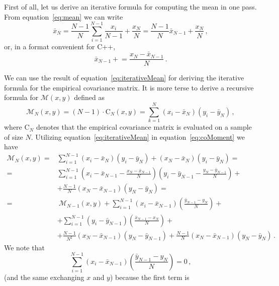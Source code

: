 \documentclass[10pt,a4paper]{report}
\begin{document}
First of all, let us derive an iterative formula for computing the mean in one pass. From equation~\ref{eq:mean} we can write
\begin{equation}
\bar{x}_N = \frac{N-1}{N}\sum\limits_{i=1}^{N-1}\frac{x_i}{N-1} + \frac{x_N}{N} = \frac{N-1}{N}\bar{x}_{N-1} + \frac{x_N}{N}\, ,
\label{eq:iterativeMean}
\end{equation}
or, in a format convenient for C++,
\begin{equation}
\bar{x}_{N-1} \mathrel{+}= \frac{x_N - \bar{x}_{N-1}}{N} \, .
\end{equation}

We can use the result of equation~\ref{eq:iterativeMean} for deriving the iterative formula for the empirical covariance matrix. It is more terse to derive a recursive formula for $\mathcal{M}(x,y)$ defined as
\begin{equation}
\mathcal{M}_N(x,y) = (N-1)\cdot\mbox{C}_N(x,y) = \sum\limits_{k=1}^N (x_i - \bar{x}_N)(y_i - \bar{y}_N)\, ,
\label{eq:coMoment}
\end{equation}
where $\mbox{C}_N$ denotes that the empirical covariance matrix is evaluated on a sample of size $N$. Utilizing equation~\ref{eq:iterativeMean} in equation~\ref{eq:coMoment} we have
\begin{equation}
\begin{aligned}
\mathcal{M}_N(x,y) =& \sum\limits_{i=1}^{N-1}(x_i - \bar{x}_N)(y_i - \bar{y}_N) + (x_N - \bar{x}_N)(y_i - \bar{y}_N) = \\
=& \sum\limits_{i=1}^{N-1}\left(x_i - \bar{x}_{N-1} - \frac{x_N - \bar{x}_{N-1}}{N}\right)\left(y_i - \bar{y}_{N-1} - \frac{y_N - \bar{y}_{N-1}}{N}\right) +\\
&+ \frac{N-1}{N}(x_N - \bar{x}_{N-1})(y_N - \bar{y}_N) = \\
=& \ \mathcal{M}_{N-1}(x,y) + \sum\limits_{i=1}^{N-1}(x_i-\bar{x}_{N-1})\left(\frac{\bar{y}_{N-1} - y_N}{N}\right) +\\
&+ \sum\limits_{i=1}^{N-1}(y_i-\bar{y}_{N-1})\left(\frac{\bar{x}_{N-1} - x_N}{N}\right) +\\
&+ \frac{N-1}{N^2}(x_N - \bar{x}_{N-1})(y_N - \bar{y}_{N-1}) + \frac{N-1}{N}(x_N - \bar{x}_{N-1})(y_N - \bar{y}_N) \, .
\end{aligned}
\end{equation}
We note that
\begin{equation}
\sum\limits_{i=1}^{N-1}(x_i-\bar{x}_{N-1})\left(\frac{\bar{y}_{N-1} - y_N}{N}\right) = 0\, ,
\end{equation}
(and the same exchanging $x$ and $y$) because the first term is
\end{document}
